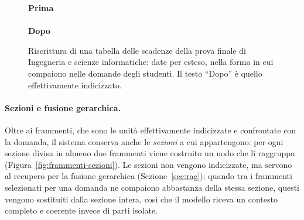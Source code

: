\begin{figure}[H]
  \centering
  \begin{minipage}{\textwidth}
    \textbf{\footnotesize Prima}\\[2pt]
    \\[6pt]
    \textbf{\footnotesize Dopo}\\[2pt]
  \end{minipage}
  \caption{Riscrittura di una tabella delle scadenze della prova finale di Ingegneria e scienze informatiche: date per esteso, nella forma in cui compaiono
  nelle domande degli studenti. Il testo ``Dopo'' è quello effettivamente indicizzato.}
  \label{fig:tabella-leggibile}
\end{figure}

\paragraph{Sezioni e fusione gerarchica.} Oltre ai frammenti, che sono le unità effettivamente indicizzate e
confrontate con la domanda, il sistema conserva anche le \emph{sezioni} a cui appartengono: per ogni sezione divisa
in almeno due frammenti viene costruito un nodo che li raggruppa (Figura~\ref{fig:frammenti-sezioni}). Le sezioni
non vengono indicizzate, ma servono al recupero per la fusione gerarchica (Sezione~\ref{sec:rag}): quando tra i
frammenti selezionati per una domanda ne compaiono abbastanza della stessa sezione, questi vengono sostituiti dalla
sezione intera, così che il modello riceva un contesto completo e coerente invece di parti isolate.

